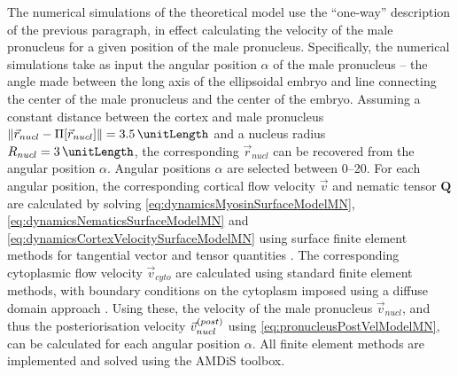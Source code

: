 The numerical simulations of the theoretical model use the \enquote{one-way} description of the previous paragraph, in effect calculating the velocity of the male pronucleus for a given position of the male pronucleus. Specifically, the numerical simulations take as input the angular position $\alpha$ of the male pronucleus -- the angle made between the long axis of the ellipsoidal embryo and line connecting the center of the male pronucleus and the center of the embryo. Assuming a constant distance between the cortex and male pronucleus $\norm{\vec{r}_{nucl} - \Pi[\vec{r}_{nucl}]} = \SI{3.5}{\unitLength}$ and a nucleus radius $R_{nucl} = \SI{3}{\unitLength}$, the corresponding $\vec{r}_{nucl}$ can be recovered from the angular position $\alpha$. Angular positions $\alpha$ are selected between \SIrange{0}{20}{\unitAngle}. For each angular position, the corresponding cortical flow velocity $\vec{v}$ and nematic tensor $\mathbf{Q}$ are calculated by solving \autoref{eq:dynamicsMyosinSurfaceModelMN}, \autoref{eq:dynamicsNematicsSurfaceModelMN} and \autoref{eq:dynamicsCortexVelocitySurfaceModelMN} using surface finite element methods for tangential vector and tensor quantities \citep{Nestler_JCP_2019}. The corresponding cytoplasmic flow velocity $\vec{v}_{cyto}$ are calculated using standard finite element methods, with boundary conditions on the cytoplasm imposed using a diffuse domain approach \citep{Li_CMS_2009}. Using these, the velocity of the male pronucleus $\vec{v}_{nucl}$, and thus the posteriorisation velocity $\vec{v}^{(post)}_{nucl}$ using \autoref{eq:pronucleusPostVelModelMN}, can be calculated for each angular position $\alpha$. All finite element methods are implemented and solved using the AMDiS toolbox.
